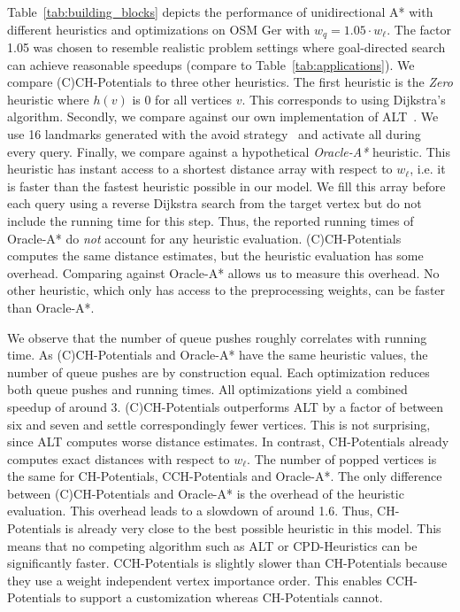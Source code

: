 \documentclass[manuscript,review]{acmart}
\begin{document}
Table~\ref{tab:building_blocks} depicts the performance of unidirectional A* with different heuristics and optimizations on OSM Ger with $w_q = 1.05 \cdot w_\ell$.
The factor 1.05 was chosen to resemble realistic problem settings where goal-directed search can achieve reasonable speedups (compare to Table~\ref{tab:applications}).
We compare (C)CH-Potentials to three other heuristics.
The first heuristic is the \emph{Zero} heuristic where $h(v)$ is $0$ for all vertices $v$.
This corresponds to using Dijkstra's algorithm.
Secondly, we compare against our own implementation of ALT~\cite{gw-cppsp-05}.
We use 16 landmarks generated with the avoid strategy~\cite{gw-cppsp-05} and activate all during every query.
Finally, we compare against a hypothetical \emph{Oracle-A*} heuristic.
This heuristic has instant access to a shortest distance array with respect to $w_\ell$, i.e. it is faster than the fastest heuristic possible in our model.
We fill this array before each query using a reverse Dijkstra search from the target vertex but do not include the running time for this step.
Thus, the reported running times of Oracle-A* do \emph{not} account for any heuristic evaluation.
(C)CH-Potentials computes the same distance estimates, but the heuristic evaluation has some overhead.
Comparing against Oracle-A* allows us to measure this overhead.
No other heuristic, which only has access to the preprocessing weights, can be faster than Oracle-A*.

We observe that the number of queue pushes roughly correlates with running time.
As (C)CH-Potentials and Oracle-A* have the same heuristic values, the number of queue pushes are by construction equal.
Each optimization reduces both queue pushes and running times.
All optimizations yield a combined speedup of around 3.
(C)CH-Potentials outperforms ALT by a factor of between six and seven and settle correspondingly fewer vertices.
This is not surprising, since ALT computes worse distance estimates.
In contrast, CH-Potentials already computes exact distances with respect to $w_\ell$.
The number of popped vertices is the same for CH-Potentials, CCH-Potentials and Oracle-A*.
The only difference between (C)CH-Potentials and Oracle-A* is the overhead of the heuristic evaluation.
This overhead leads to a slowdown of around 1.6.
Thus, CH-Potentials is already very close to the best possible heuristic in this model.
This means that no competing algorithm such as ALT or CPD-Heuristics can be significantly faster.
CCH-Potentials is slightly slower than CH-Potentials because they use a weight independent vertex importance order.
This enables CCH-Potentials to support a customization whereas CH-Potentials cannot.
\end{document}
